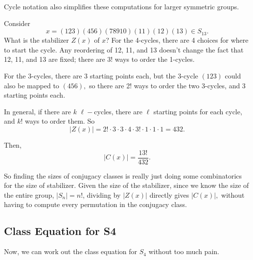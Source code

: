 Cycle notation also simplifies these computations for larger symmetric groups.

\begin{example}
Consider \[x = (123)(456)(789 10)(11)(12)(13) \in S_{13}.\] What is the stabilizer $Z(x)$ of $x$? For the 4-cycles, there are 4 choices for where to start the cycle. Any reordering of 12, 11, and 13 doesn't change the fact that 12, 11, and 13 are fixed; there are $3!$ ways to order the 1-cycles. 

For the 3-cycles, there are 3 starting points each, but the 3-cycle $(123)$ could also be mapped to $(456),$ so there are 2! ways to order the two 3-cycles, and 3 starting points each. 

In general, if there are $k$ $\ell-$cycles, there are $\ell$ starting points for each cycle, and $k!$ ways to order them. So 
\[
|Z(x)| = 2!\cdot  3 \cdot 3 \cdot  4\cdot 3! \cdot 1 \cdot 1 \cdot 1 = 432.
\]

Then,
\[
|C(x)| = \frac{13!}{432}.
\]
\end{example}

So finding the sizes of conjugacy classes is really just doing some combinatorics for the size of stabilizer. Given the size of the stabilizer, since we know the size of the entire group, $|S_n| = n!$, dividing by $|Z(x)|$ directly gives $|C(x)|,$ without having to compute every permutation in the conjugacy class.

\subsection{Class Equation for S4}

Now, we can work out the class equation for $S_4$ without too much pain. 

